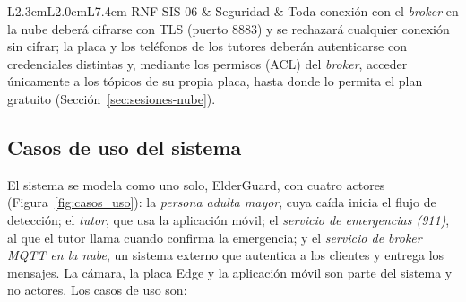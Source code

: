 \documentclass[12pt,a4paper,oneside]{book}
\theoremstyle{plain}
\theoremstyle{definition}
\theoremstyle{remark}
\begin{document}
\begin{table}[H]
\begin{tabular}{L{2.3cm}L{2.0cm}L{7.4cm}}
\addlinespace
RNF-SIS-06 & Seguridad & Toda conexión con el \textit{broker} en la nube deberá cifrarse con TLS (puerto 8883) y se rechazará cualquier conexión sin cifrar; la placa y los teléfonos de los tutores deberán autenticarse con credenciales distintas y, mediante los permisos (ACL) del \textit{broker}, acceder únicamente a los tópicos de su propia placa, hasta donde lo permita el plan gratuito (Sección~\ref{sec:sesiones-nube}). \\
\bottomrule
\end{tabular}
\end{table}

\subsection{Casos de uso del sistema}
\label{sec:casos-uso}
El sistema se modela como uno solo, ElderGuard, con cuatro actores (Figura~\ref{fig:casos_uso}): la \textit{persona adulta mayor}, cuya caída inicia el flujo de detección; el \textit{tutor}, que usa la aplicación móvil; el \textit{servicio de emergencias (911)}, al que el tutor llama cuando confirma la emergencia; y el \textit{servicio de \textit{broker} MQTT en la nube}, un sistema externo que autentica a los clientes y entrega los mensajes. La cámara, la placa Edge y la aplicación móvil son parte del sistema y no actores. Los casos de uso son:
\end{document}
